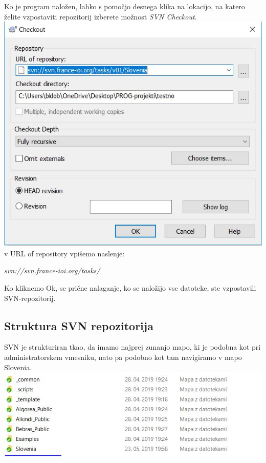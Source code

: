 \documentclass[11pt]{article} %
\begin{document}
Ko je program naložen, lahko s pomočjo desnega klika na lokacijo, na katero želite vzpostaviti repozitorij izberete možnost \textit{SVN Checkout}.\\
\includegraphics[scale=0.4]{svn_okno}\\

v URL of repository vpišemo naslenje:\\
\begin{center}
\textit{svn://svn.france-ioi.org/tasks/}
\end{center}

Ko kliknemo Ok, se prične nalaganje, ko se naložijo vse datoteke, ste vzpostavili SVN-repozitorij.\\
\pagebreak
\subsection{Struktura SVN repozitorija}
SVN je strukturiran tkao, da imamo najprej zunanjo mapo, ki je podobna kot pri administratorskem vmesniku, nato pa podobno kot tam navigiramo v mapo Slovenia.\\
\includegraphics[scale=0.6]{svn_zunanja}\\
\end{document}
